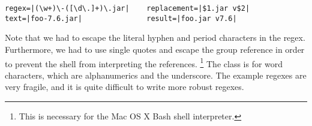 \begin{verbatim}
regex=|(\w+)\-([\d\.]+)\.jar|    replacement=|$1.jar v$2|
text=|foo-7.6.jar|               result=|foo.jar v7.6|
\end{verbatim}
%
Note that we had to escape the literal hyphen and period characters in
the regex.  Furthermore, we had to use single quotes and escape the group
reference  in order to prevent the shell from interpreting
the references.%
\footnote{This is necessary for the Mac OS X Bash shell interpreter.}
%
The class  is for word characters, which are
alphanumerics and the underscore.  The example regexes are very
fragile, and it is quite difficult to write more robust regexes.













